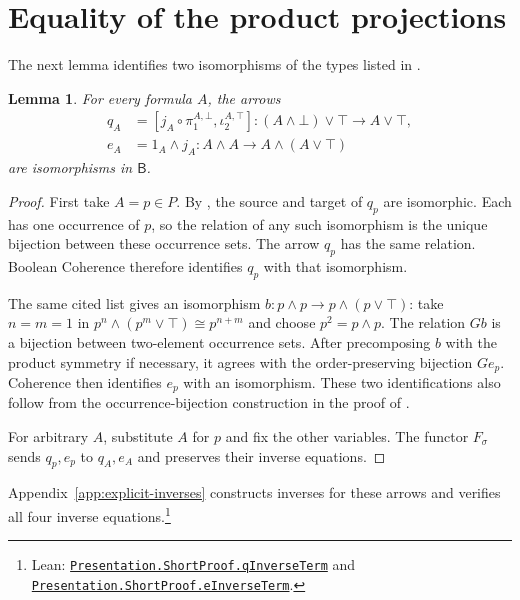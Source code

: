 \documentclass[11pt]{article}
\newtheorem{lemma}[theorem]{Lemma}
\newcommand{\B}{\mathsf B}
\begin{document}
\section{Equality of the product projections}\label{sec:collapse}

The next lemma identifies two isomorphisms of the types listed in
\cite[\S12.5, p.~294]{DP}.

\begin{lemma}\label{lem:structural-isos}
For every formula $A$, the arrows
\[
 \begin{aligned}
 q_A&=[j_A\circ\pi_1^{A,\bot},\iota_2^{A,\top}]
      :(A\wedge\bot)\vee\top\longrightarrow A\vee\top,\\
 e_A&=1_A\wedge j_A
      :A\wedge A\longrightarrow A\wedge(A\vee\top)
 \end{aligned}
\]
are isomorphisms in $\B$.
\end{lemma}

\begin{proof}
First take $A=p\in P$. By \cite[\S12.5, p.~294]{DP}, the source
and target of $q_p$ are isomorphic. Each has one occurrence of $p$,
so the relation of any such isomorphism is the unique bijection
between these occurrence sets. The arrow $q_p$ has the same relation.
Boolean Coherence therefore identifies $q_p$ with that isomorphism.

The same cited list gives an isomorphism
$b:p\wedge p\to p\wedge(p\vee\top)$: take $n=m=1$ in
$p^n\wedge(p^m\vee\top)\cong p^{n+m}$ and choose $p^2=p\wedge p$.
The relation $Gb$ is a bijection between two-element occurrence sets.
After precomposing $b$ with the product symmetry if necessary, it
agrees with the order-preserving bijection $Ge_p$. Coherence then
identifies $e_p$ with an isomorphism. These two identifications also
follow from the occurrence-bijection construction in the proof of
\cite[Lemma~7]{DPIsomorphic}.

For arbitrary $A$, substitute $A$ for $p$ and fix the other variables.
The functor $F_\sigma$ sends $q_p,e_p$ to $q_A,e_A$ and preserves
their inverse equations.
\end{proof}

Appendix~\ref{app:explicit-inverses} constructs inverses for
these arrows and verifies all four inverse equations.\footnote{\raggedright Lean:
\href{https://github.com/flengyel/Dosen-Petric-Maximality/blob/5dbee39bea09539bd130f729e82636419f71f920/DosenPetric/PresentationShortQ.lean\#L17}{\texttt{Presentation.ShortProof.\allowbreak{}qInverseTerm}} and
\href{https://github.com/flengyel/Dosen-Petric-Maximality/blob/5dbee39bea09539bd130f729e82636419f71f920/DosenPetric/PresentationShortE.lean\#L30}{\texttt{Presentation.ShortProof.\allowbreak{}eInverseTerm}}.}
\end{document}
